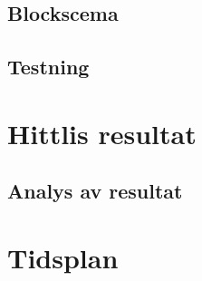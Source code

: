 \documentclass[11pt,a4paper,oneside]{book}
\begin{document}
\section{Blockscema}
\section{Testning}

\chapter{Hittlis resultat}
\section{Analys av resultat}

\chapter{Tidsplan}




\end{document}
